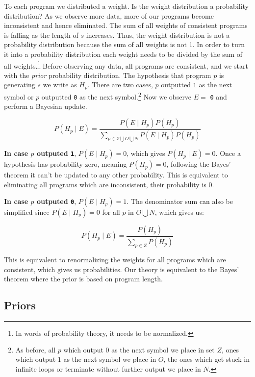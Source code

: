 To each program we distributed a weight.
Is the weight distribution a probability distribution?
As we observe more data, more of our programs become inconsistent and hence eliminated.
The sum of all weights of consistent programs is falling as the length of $s$ increases.
Thus, the weight distribution is not a probability distribution because the sum of all weights is not 1.
In order to turn it into a probability distribution each weight needs to be divided by the sum of all weights.\footnote{In words of probability theory, it needs to be normalized.}
Before observing any data, all programs are consistent, and we start with the \textit{prior} probability distribution.
The hypothesis that program $p$ is generating $s$ we write as $H_{p}$.
There are two cases, $p$ outputted \texttt{1} as the next symbol or $p$ outputted \texttt{0} as the next symbol.\footnote{
As before, all $p$ which output $0$ as the next symbol we place in set $Z$, ones which output $1$ as the next symbol we place in $O$, the ones which get stuck in infinite loops or terminate without further output we place in $N$.}
Now we observe $E =$ \texttt{0} and perform a Bayesian update.

$$ P(H_{p} \mid E) = \frac{P(E \mid H_{p}) P(H_{p})}{\sum\limits_{p \in Z \bigcup O \bigcup N} P(E \mid H_p) P(H_p)} $$

\vspace{15px}

\textbf{In case $p$ outputed \texttt{1}}, $P(E \mid H_{p}) = 0$, which gives $P(H_{p} \mid E) = 0$.
Once a hypothesis has probability zero, meaning $P(H_p) = 0$, following the Bayes' theorem it can't be updated to any other probability.
This is equivalent to eliminating all programs which are inconsistent, their probability is $0$.

\vspace{15px}

\textbf{In case $p$ outputed \texttt{0}}, $P(E \mid H_{p}) = 1$.
The denominator sum can also be simplified since $P(E \mid H_{p}) = 0$ for all $p$ in $O \bigcup N$, which gives us:

$$ P(H_{p} \mid E) = \frac{P(H_{p})}{\sum\limits_{p \in Z } P(H_p)} $$

This is equivalent to renormalizing the weights for all programs which are consistent, which gives us probabilities.
Our theory is equivalent to the Bayes' theorem where the prior is based on program length.

\newpage

\subsection{Priors}

